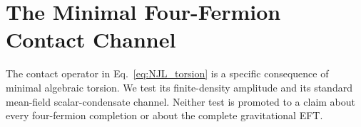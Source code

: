 \documentclass[aps,prd,twocolumn,superscriptaddress,showpacs,preprintnumbers,nofootinbib,longbibliography,floatfix]{revtex4-2}
\newcommand{\MPl}{M_{\rm Pl}}
\begin{document}

\section{The Minimal Four-Fermion Contact Channel}\label{sec:fourfermion}

The contact operator in Eq.~\eqref{eq:NJL_torsion} is a specific consequence
of minimal algebraic torsion.  We test its finite-density amplitude and its
standard mean-field scalar-condensate channel.  Neither test is promoted to a
claim about every four-fermion completion or about the complete gravitational
EFT.
\end{document}
